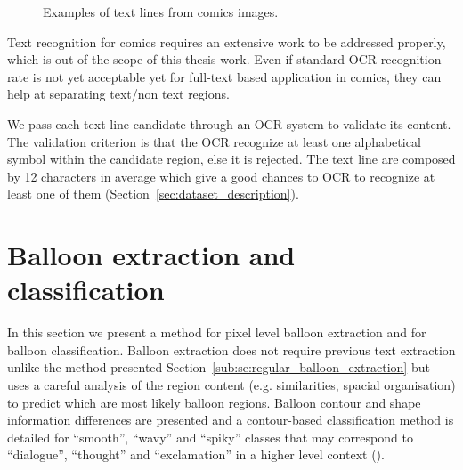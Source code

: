  \begin{figure}[!ht]  %
   \centering
  \caption[Examples of text lines from comics images]{Examples of text lines from comics images.}
  \label{fig:in:texlines_example}
 \end{figure}

Text recognition for comics requires an extensive work to be addressed properly, which is out of the scope of this thesis work.
Even if standard OCR recognition rate is not yet acceptable yet for full-text based application in comics, they can help at separating text/non text regions.

We pass each text line candidate through an OCR system to validate its content.
The validation criterion is that the OCR recognize at least one alphabetical symbol within the candidate region, else it is rejected.
The text line are composed by 12 characters in average which give a good chances to OCR to recognize at least one of them (Section~\ref{sec:dataset_description}).




\section{Balloon extraction and classification}
\label{sec:in:balloon}

In this section we present a method for pixel level balloon extraction and for balloon classification.
Balloon extraction does not require previous text extraction unlike the method presented Section~\ref{sub:se:regular_balloon_extraction} but uses a careful analysis of the region content (e.g. similarities, spacial organisation) to predict which are most likely balloon regions.
Balloon contour and shape information differences are presented and a contour-based classification method is detailed for ``smooth'', ``wavy'' and ``spiky'' classes that may correspond to ``dialogue'', ``thought'' and ``exclamation'' in a higher level context ().

